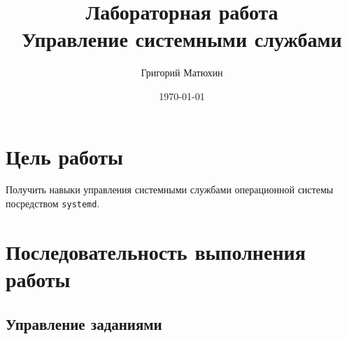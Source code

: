 \documentclass[12pt]{article}
\author{Григорий Матюхин}
\date{\today}
\title{Лабораторная работа \textnumero6\\Управление системными службами}
\begin{document}
\maketitle
\newpage
\tableofcontents
\newpage
\section{Цель работы}
Получить навыки управления системными службами операционной системы посредством \texttt{systemd}.
\section{Последовательность выполнения работы}

\subsection{Управление заданиями}
\end{document}
